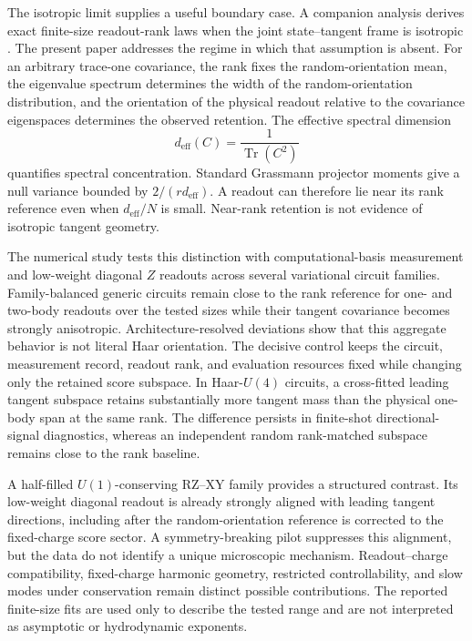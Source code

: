 The isotropic limit supplies a useful boundary case. A companion analysis derives exact finite-size readout-rank laws when the joint state--tangent frame is isotropic \cite{AitHaddou2026IsotropicRankLaws}. The present paper addresses the regime in which that assumption is absent. For an arbitrary trace-one covariance, the rank fixes the random-orientation mean, the eigenvalue spectrum determines the width of the random-orientation distribution, and the orientation of the physical readout relative to the covariance eigenspaces determines the observed retention. The effective spectral dimension
\begin{equation}
 d_{\mathrm{eff}}(C)=\frac{1}{\operatorname{Tr}(C^2)}
\end{equation}
quantifies spectral concentration. Standard Grassmann projector moments \cite{CollinsMatsumoto2017,Bendokat2024} give a null variance bounded by $2/(r d_{\mathrm{eff}})$. A readout can therefore lie near its rank reference even when $d_{\mathrm{eff}}/N$ is small. Near-rank retention is not evidence of isotropic tangent geometry.

The numerical study tests this distinction with computational-basis measurement and low-weight diagonal $Z$ readouts across several variational circuit families. Family-balanced generic circuits remain close to the rank reference for one- and two-body readouts over the tested sizes while their tangent covariance becomes strongly anisotropic. Architecture-resolved deviations show that this aggregate behavior is not literal Haar orientation. The decisive control keeps the circuit, measurement record, readout rank, and evaluation resources fixed while changing only the retained score subspace. In Haar-$U(4)$ circuits, a cross-fitted leading tangent subspace retains substantially more tangent mass than the physical one-body span at the same rank. The difference persists in finite-shot directional-signal diagnostics, whereas an independent random rank-matched subspace remains close to the rank baseline.

A half-filled $U(1)$-conserving RZ--XY family provides a structured contrast. Its low-weight diagonal readout is already strongly aligned with leading tangent directions, including after the random-orientation reference is corrected to the fixed-charge score sector. A symmetry-breaking pilot suppresses this alignment, but the data do not identify a unique microscopic mechanism. Readout--charge compatibility, fixed-charge harmonic geometry, restricted controllability, and slow modes under conservation remain distinct possible contributions. The reported finite-size fits are used only to describe the tested range and are not interpreted as asymptotic or hydrodynamic exponents.

